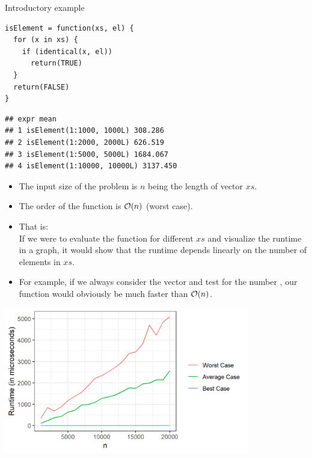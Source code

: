 \documentclass[11pt,compress,t,notes=noshow, xcolor=table]{beamer}
\begin{document}
\begin{vbframe}{Introductory example}
\lz
\footnotesize
\begin{verbatim}
isElement = function(xs, el) {
  for (x in xs) {
    if (identical(x, el))
      return(TRUE)
  }
  return(FALSE)
}
\end{verbatim}

\lz
\begin{verbatim}
## expr mean
## 1 isElement(1:1000, 1000L) 308.286
## 2 isElement(1:2000, 2000L) 626.519
## 3 isElement(1:5000, 5000L) 1684.067
## 4 isElement(1:10000, 10000L) 3137.450
\end{verbatim}

%

\normalsize
\framebreak

\begin{itemize}
  \item The input size of the problem is $n$ being the length of vector $xs$.
  \item The order of the function is $\mathcal{O}(n)$ (worst case).
  \item That is: \\
  If we were to evaluate the function for different $xs$ and visualize the runtime in
  a graph, it would show that the runtime depends linearly on the number of elements in $xs$.
   \item For example, if we always consider the vector  and test for the number , our function would obviously be much faster than $\mathcal{O}(n)$.
\end{itemize}


\framebreak

\begin{center}
\includegraphics[width=0.8\textwidth]{figure_man/runtime.png}
\end{center}


\end{vbframe}
\end{document}
